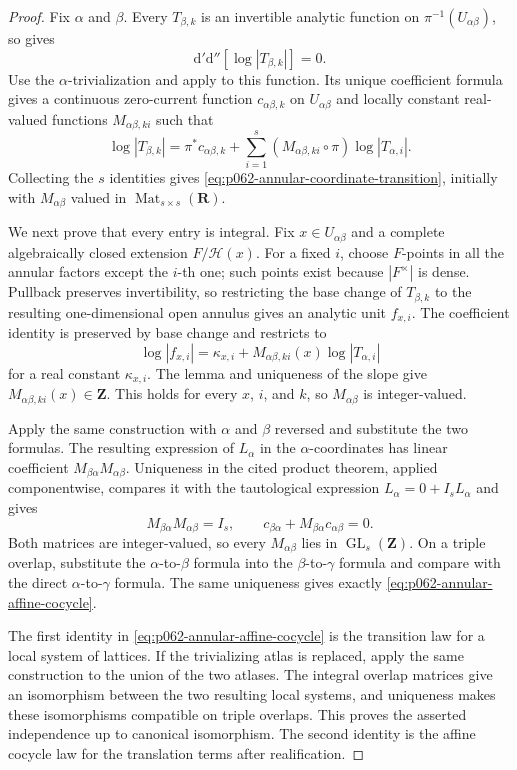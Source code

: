 \begin{proof}
Fix $\alpha$ and $\beta$.  Every $T_{\beta,k}$ is an invertible analytic
function on $\pi^{-1}(U_{\alpha\beta})$, so
 gives
\[
 \mathrm d'\mathrm d''[\log|T_{\beta,k}|]=0.
\]
Use the $\alpha$-trivialization and apply
 to this function.
Its unique coefficient formula gives a continuous zero-current function
$c_{\alpha\beta,k}$ on $U_{\alpha\beta}$ and locally constant real-valued
functions $M_{\alpha\beta,ki}$ such that
\[
 \log|T_{\beta,k}|
 =\pi^*c_{\alpha\beta,k}
  +\sum_{i=1}^s(M_{\alpha\beta,ki}\circ\pi)
                      \log|T_{\alpha,i}|.
\]
Collecting the $s$ identities gives
\eqref{eq:p062-annular-coordinate-transition}, initially with
$M_{\alpha\beta}$ valued in $\operatorname{Mat}_{s\times s}(\mathbf R)$.

We next prove that every entry is integral.  Fix
$x\in U_{\alpha\beta}$ and a complete algebraically closed extension
 $F/\mathscr H(x)$.  For a fixed $i$, choose $F$-points in all the annular
factors except the $i$-th one; such points exist because $|F^\times|$ is
dense.  Pullback preserves invertibility, so restricting the base change of
$T_{\beta,k}$ to the resulting one-dimensional open annulus gives an
analytic unit $f_{x,i}$.  The coefficient identity is preserved by base
change and restricts to
\[
 \log|f_{x,i}|=\kappa_{x,i}
       +M_{\alpha\beta,ki}(x)\log|T_{\alpha,i}|
\]
for a real constant $\kappa_{x,i}$.  The lemma and uniqueness of the slope
give $M_{\alpha\beta,ki}(x)\in\mathbf Z$.  This holds for every $x$, $i$,
and $k$, so $M_{\alpha\beta}$ is integer-valued.

Apply the same construction with $\alpha$ and $\beta$ reversed and
substitute the two formulas.  The resulting expression of $L_\alpha$ in
the $\alpha$-coordinates has linear coefficient
$M_{\beta\alpha}M_{\alpha\beta}$.  Uniqueness in the cited product theorem,
applied componentwise, compares it with the tautological expression
$L_\alpha=0+I_sL_\alpha$ and gives
\[
 M_{\beta\alpha}M_{\alpha\beta}=I_s,
 \qquad
 c_{\beta\alpha}+M_{\beta\alpha}c_{\alpha\beta}=0.
\]
Both matrices are integer-valued, so every $M_{\alpha\beta}$ lies in
$\operatorname{GL}_s(\mathbf Z)$.  On a triple overlap, substitute the
$\alpha$-to-$\beta$ formula into the $\beta$-to-$\gamma$ formula and compare
with the direct $\alpha$-to-$\gamma$ formula.  The same uniqueness gives
exactly \eqref{eq:p062-annular-affine-cocycle}.

The first identity in \eqref{eq:p062-annular-affine-cocycle} is the
transition law for a local system of lattices.  If the trivializing atlas is
replaced, apply the same construction to the union of the two atlases.  The
integral overlap matrices give an isomorphism between the two resulting
local systems, and uniqueness makes these isomorphisms compatible on triple
overlaps.  This proves the asserted independence up to canonical
isomorphism.  The second identity is the affine cocycle law for the
translation terms after realification.


\end{proof}

